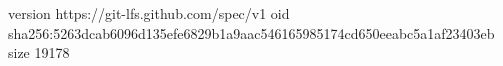 version https://git-lfs.github.com/spec/v1
oid sha256:5263dcab6096d135efe6829b1a9aac546165985174cd650eeabc5a1af23403eb
size 19178
